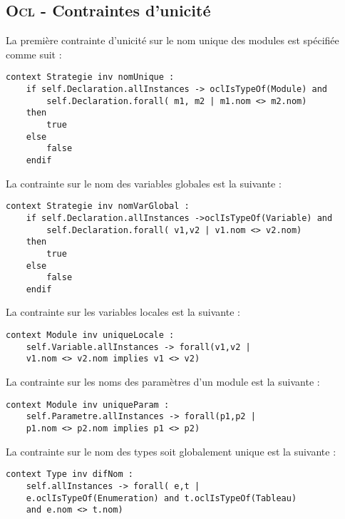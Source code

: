 
\subsection{\textsc{Ocl} - Contraintes d'unicité}
\label{sec:question14}

La première contrainte d'unicité sur le nom unique des modules est spécifiée comme suit :

\begin{lstlisting}[caption=Nom unique au sein d'une stratégie,captionpos=b,label={lst:nom_unique},language=OCL]
context Strategie inv nomUnique :
	if self.Declaration.allInstances -> oclIsTypeOf(Module) and
		self.Declaration.forall( m1, m2 | m1.nom <> m2.nom)
	then
		true
	else
		false
	endif
\end{lstlisting}

La contrainte sur le nom des variables globales est la suivante :

\begin{lstlisting}[caption=Nom unique d'une variable globale,captionpos=b,label={lst:unique_globale},language=OCL]
context Strategie inv nomVarGlobal :
	if self.Declaration.allInstances ->oclIsTypeOf(Variable) and
		self.Declaration.forall( v1,v2 | v1.nom <> v2.nom)
	then
		true
	else
		false
	endif
\end{lstlisting}

La contrainte sur les variables locales est la suivante :

\begin{lstlisting}[caption=Nom unique des variables locales,captionpos=b,label={lst:nom_locale},language=OCL]
context Module inv uniqueLocale :
	self.Variable.allInstances -> forall(v1,v2 | 
	v1.nom <> v2.nom implies v1 <> v2)
\end{lstlisting}

La contrainte sur les noms des paramètres d'un module est la suivante :

\begin{lstlisting}[caption=Nom unique des paramètres,captionpos=b,label={lst:unique_param},language=OCL]
context Module inv uniqueParam :
	self.Parametre.allInstances -> forall(p1,p2 | 
	p1.nom <> p2.nom implies p1 <> p2)
\end{lstlisting}

La contrainte sur le nom des types soit globalement unique est la suivante :

\begin{lstlisting}[caption=Nom unique des types,captionpos=b,label={lst:type_unique},language=OCL]
context Type inv difNom :
	self.allInstances -> forall( e,t | 
	e.oclIsTypeOf(Enumeration) and t.oclIsTypeOf(Tableau) 
	and e.nom <> t.nom)
\end{lstlisting}